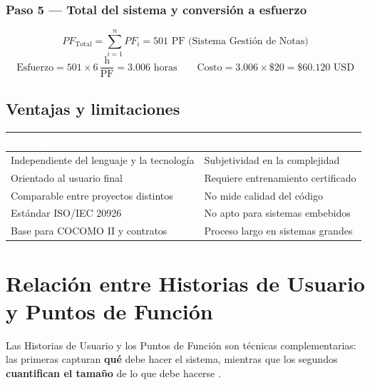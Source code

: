 \documentclass[12pt, a4paper]{article}
\begin{document}
\subsubsection{Paso 5 — Total del sistema y conversión a esfuerzo}

\begin{formulabox}
  \[
    PF_{\text{Total}} = \sum_{i=1}^{n} PF_i = 501 \text{ PF (Sistema Gestión de Notas)}
  \]
  \[
    \text{Esfuerzo} = 501 \times 6\,\frac{\text{h}}{\text{PF}} = 3.006\text{ horas}
    \qquad
    \text{Costo} = 3.006 \times \$20 = \$60.120\text{ USD}
  \]
\end{formulabox}

\subsection{Ventajas y limitaciones}

\begin{tabular}{p{6.5cm} p{6cm}}
  \toprule
  \rowcolor{espeazul}
  \textcolor{white}{\textbf{Ventajas}} & \textcolor{white}{\textbf{Limitaciones}} \\
  \midrule
  Independiente del lenguaje y la tecnología & Subjetividad en la complejidad \\
  Orientado al usuario final & Requiere entrenamiento certificado \\
  Comparable entre proyectos distintos & No mide calidad del código \\
  Estándar ISO/IEC 20926 \parencite{iso2009} & No apto para sistemas embebidos \\
  Base para COCOMO II y contratos & Proceso largo en sistemas grandes \\
  \bottomrule
\end{tabular}

\section{Relación entre Historias de Usuario y Puntos de Función}

Las Historias de Usuario y los Puntos de Función son técnicas complementarias:
las primeras capturan \textbf{qué} debe hacer el sistema, mientras que los
segundos \textbf{cuantifican el tamaño} de lo que debe hacerse
\parencite{cohn2004, ifpug2010}.
\end{document}
